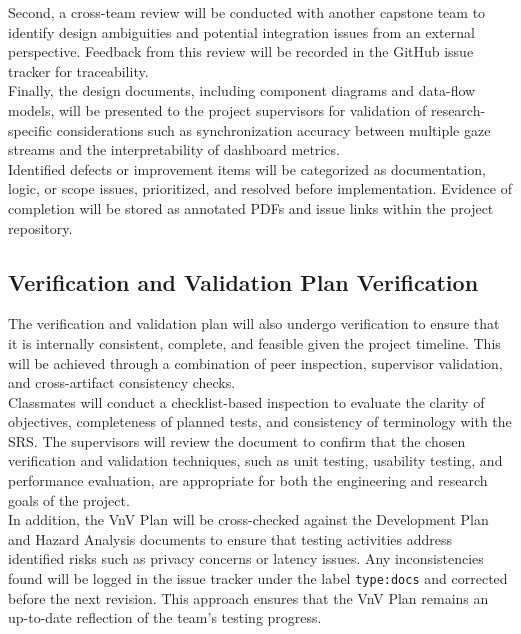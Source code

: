 \documentclass[12pt, titlepage]{article}
\begin{document}
Second, a cross-team review will be conducted with another capstone team to identify design ambiguities and potential integration issues from an external perspective. Feedback from this review will be recorded in the GitHub issue tracker for traceability. \\

Finally, the design documents, including component diagrams and data-flow models, will be presented to the project supervisors for validation of research-specific considerations such as synchronization accuracy between multiple gaze streams and the interpretability of dashboard metrics. \\

Identified defects or improvement items will be categorized as documentation, logic, or scope issues, prioritized, and resolved before implementation. Evidence of completion will be stored as annotated PDFs and issue links within the project repository.

\subsection{Verification and Validation Plan Verification}

The verification and validation plan will also undergo verification to ensure that it is internally consistent, complete, and feasible given the project timeline. This will be achieved through a combination of peer inspection, supervisor validation, and cross-artifact consistency checks. \\

Classmates will conduct a checklist-based inspection to evaluate the clarity of objectives, completeness of planned tests, and consistency of terminology with the SRS. The supervisors will review the document to confirm that the chosen verification and validation techniques, such as unit testing, usability testing, and performance evaluation, are appropriate for both the engineering and research goals of the project. \\ 

In addition, the VnV Plan will be cross-checked against the Development Plan and Hazard Analysis documents to ensure that testing activities address identified risks such as privacy concerns or latency issues. Any inconsistencies found will be logged in the issue tracker under the label \texttt{type:docs} and corrected before the next revision. This approach ensures that the VnV Plan remains an up-to-date reflection of the team’s testing progress.
\end{document}
